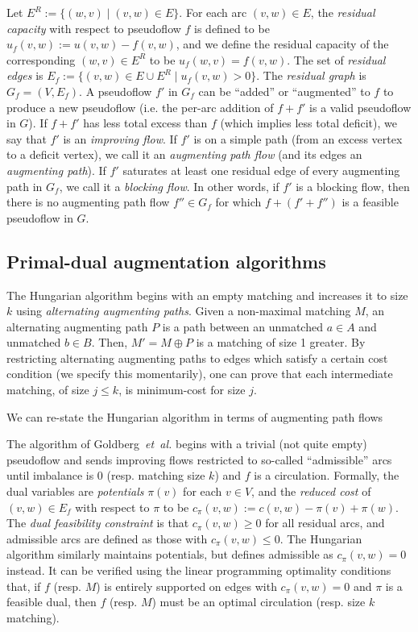 \documentclass[11pt]{article}
\def\etal{\textsl{et~al.}}
\theoremstyle{plain}
\begin{document}
Let $E^R := \{(w, v) \mid (v, w) \in E\}$.
For each arc $(v, w) \in E$, the \emph{residual capacity} with respect to 
pseudoflow $f$ is defined to be $u_f(v, w) := u(v, w) - f(v, w)$, and we define 
the residual capacity of the corresponding $(w, v) \in E^R$ to be 
$u_f(w, v) = f(v, w)$.
The set of \emph{residual edges} is 
$E_f := \{(v, w) \in E \cup E^R \mid u_f(v, w) > 0\}$.
The \emph{residual graph} is $G_f = (V, E_f)$.
A pseudoflow $f'$ in $G_f$ can be ``added'' or ``augmented'' to $f$ to produce 
a new pseudoflow (i.e. the per-arc addition of $f + f'$ is a valid pseudoflow 
in $G$).
If $f + f'$ has less total excess than $f$ (which implies less total deficit),
we say that $f'$ is an \emph{improving flow}.
If $f'$ is on a simple path (from an excess vertex to a deficit vertex), we 
call it an \emph{augmenting path flow} (and its edges an 
\emph{augmenting path}).
If $f'$ saturates at least one residual edge of every augmenting path in $G_f$,
we call it a \emph{blocking flow}.
In other words, if $f'$ is a blocking flow, then there is no augmenting path
flow $f'' \in G_f$ for which $f + (f' + f'')$ is a feasible pseudoflow in $G$.

\subsection{Primal-dual augmentation algorithms}

The Hungarian algorithm begins with an empty matching and increases it to size 
$k$ using \emph{alternating augmenting paths}.
Given a non-maximal matching $M$, an alternating augmenting path $P$ is a path
between an unmatched $a \in A$ and unmatched $b \in B$.
Then, $M' = M \oplus P$ is a matching of size 1 greater.
By restricting alternating augmenting paths to edges which satisfy a certain 
cost condition (we specify this momentarily), one can prove that each 
intermediate matching, of size $j \leq k$, is minimum-cost for size $j$.

We can re-state the Hungarian algorithm in terms of augmenting path flows



The algorithm of Goldberg~{\etal} begins with a trivial (not quite empty) 
pseudoflow and sends improving flows restricted to so-called ``admissible'' 
arcs until imbalance is 0 (resp. matching size $k$) and $f$ is a circulation.
Formally, the dual variables are \emph{potentials} $\pi(v)$ for each $v \in V$,
and the \emph{reduced cost} of $(v, w) \in E_f$ with respect to $\pi$ to be 
$c_\pi(v, w) := c(v, w) - \pi(v) + \pi(w)$.
The \emph{dual feasibility constraint} is that $c_\pi(v, w) \geq 0$ for all 
residual arcs, and admissible arcs are defined as those with 
$c_\pi(v, w) \leq 0$.
The Hungarian algorithm similarly maintains potentials, but defines admissible 
as $c_\pi(v, w) = 0$ instead.
It can be verified using the linear programming optimality conditions that, 
if $f$ (resp. $M$) is entirely supported on edges with $c_\pi(v, w) = 0$ and 
$\pi$ is a feasible dual, then $f$ (resp. $M$) must be an optimal circulation
(resp. size $k$ matching).
\end{document}

